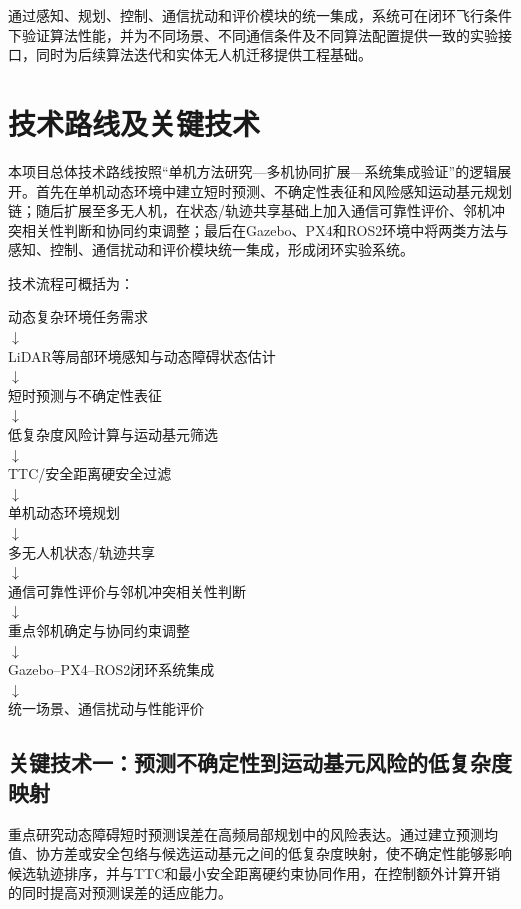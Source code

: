 通过感知、规划、控制、通信扰动和评价模块的统一集成，系统可在闭环飞行条件下验证算法性能，并为不同场景、不同通信条件及不同算法配置提供一致的实验接口，同时为后续算法迭代和实体无人机迁移提供工程基础。

\section{技术路线及关键技术}

本项目总体技术路线按照“单机方法研究—多机协同扩展—系统集成验证”的逻辑展开。首先在单机动态环境中建立短时预测、不确定性表征和风险感知运动基元规划链；随后扩展至多无人机，在状态/轨迹共享基础上加入通信可靠性评价、邻机冲突相关性判断和协同约束调整；最后在Gazebo、PX4和ROS2环境中将两类方法与感知、控制、通信扰动和评价模块统一集成，形成闭环实验系统。

技术流程可概括为：

\begin{center}
动态复杂环境任务需求\\
$\downarrow$\\
LiDAR等局部环境感知与动态障碍状态估计\\
$\downarrow$\\
短时预测与不确定性表征\\
$\downarrow$\\
低复杂度风险计算与运动基元筛选\\
$\downarrow$\\
TTC/安全距离硬安全过滤\\
$\downarrow$\\
单机动态环境规划\\
$\downarrow$\\
多无人机状态/轨迹共享\\
$\downarrow$\\
通信可靠性评价与邻机冲突相关性判断\\
$\downarrow$\\
重点邻机确定与协同约束调整\\
$\downarrow$\\
Gazebo--PX4--ROS2闭环系统集成\\
$\downarrow$\\
统一场景、通信扰动与性能评价
\end{center}

\subsection{关键技术一：预测不确定性到运动基元风险的低复杂度映射}

重点研究动态障碍短时预测误差在高频局部规划中的风险表达。通过建立预测均值、协方差或安全包络与候选运动基元之间的低复杂度映射，使不确定性能够影响候选轨迹排序，并与TTC和最小安全距离硬约束协同作用，在控制额外计算开销的同时提高对预测误差的适应能力。

